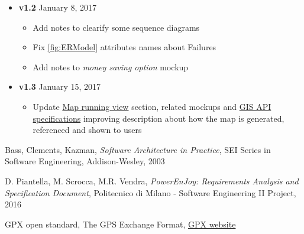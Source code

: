 \begin{appendices}
\begin{itemize}
\begin{itemize}
		\end{itemize}
		\item \textbf{v1.2} January 8, 2017
		\begin{itemize}
			\item Add notes to clearify some sequence diagrams
			\item Fix \autoref{fig:ERModel} attributes names about Failures
			\item Add notes to \emph{money saving option} mockup
		\end{itemize}
		\item  \textbf{v1.3} January 15, 2017
		\begin{itemize}
			\item Update \hyperref[sec:mapRunView]{Map running view} section, related mockups and \hyperref[sec:gis]{GIS API specifications} improving description about how the map is generated, referenced  and shown to users
		\end{itemize}
	\end{itemize}
	
\end{appendices}


\begin{thebibliography}{9}

Bass, Clements, Kazman, \emph{Software Architecture in Practice}, SEI Series in Software Engineering, Addison-­Wesley, 2003

D. Piantella, M. Scrocca, M.R. Vendra, \emph{PowerEnJoy: Requirements Analysis and Specification Document}, Politecnico di Milano - Software Engineering II Project, 2016

GPX open standard, The GPS Exchange Format, \href{http://www.topografix.com/gpx.asp}{GPX website}
\end{thebibliography}